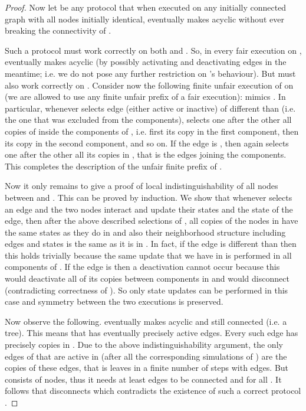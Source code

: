 \documentclass[preprint]{elsarticle}
\begin{document}
\begin{proof}
Now let  be any protocol that when executed on any initially connected
graph  with all nodes initially identical, eventually makes  acyclic
without ever breaking the connectivity of .

Such a protocol  must work correctly on both  and . So, in every fair
execution  on ,  eventually makes  acyclic (by possibly activating and
deactivating edges in the meantime; i.e. we do not pose any further
restriction on 's behaviour). But  must also work correctly on .
Consider now the following finite unfair execution  of  on  (we are
allowed to use any finite unfair prefix of a fair execution):  mimics .
In particular, whenever  selects edge  (either active or
inactive) of  different than  (i.e. the one that was excluded from
the components),  selects one after the other all copies of 
inside the components of , i.e. first its copy in the first component,
then its copy in the second component, and so on. If the edge is
, then  again selects one after the other all its copies in ,
that is the edges joining the components. This completes the description
of the unfair finite prefix of .

Now it only remains to give a proof of local indistinguishability of all
nodes between  and . This can be proved by induction. We show that
whenever  selects an edge and the two nodes interact and update their
states and the state of the edge, then after the above described
selections of , all copies of the nodes in  have the same states as
they do in  and also their neighborhood structure including edges and
states is the same as it is in . In fact, if the edge is different than
 then this holds trivially because the same update that we have in
 is performed in all components of . If the edge is  then a
deactivation cannot occur because this would deactivate all of its copies
between components in  and would disconnect  (contradicting
correctness of ). So only state updates can be performed in this case and
symmetry between the two executions is preserved.

Now observe the following.  eventually makes  acyclic and still
connected (i.e. a tree). This means that  has eventually precisely 
active edges. Every such edge has precisely  copies in . Due to the
above indistinguishability argument, the only edges of  that are active
in  (after all the corresponding simulations of ) are the copies of
these  edges, that is  leaves in a finite number of steps  with
 edges. But  consists of  nodes, thus it needs at least
 edges to be connected and  for all . It follows that
 disconnects  which contradicts the existence of such a correct
protocol .
\end{proof}
\end{document}
